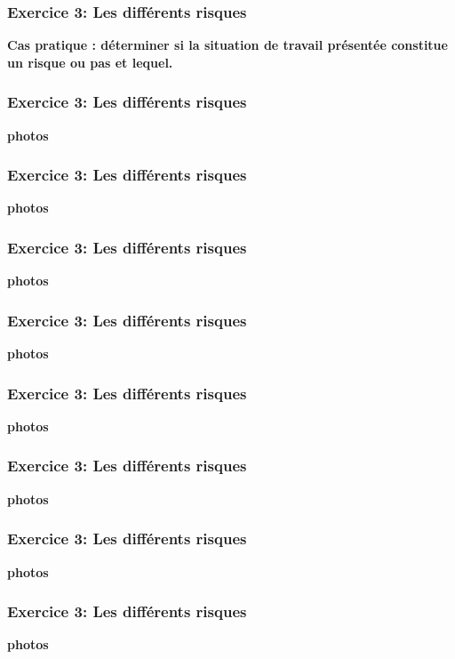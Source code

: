 \documentclass{beamer}
\begin{document}
\begin{frame}
\frametitle{Exercice 3: Les différents risques}

\textbf{Cas pratique : déterminer si la situation de travail présentée constitue un risque ou pas et lequel.} 
\end{frame}

\begin{frame}
\frametitle{Exercice 3: Les différents risques}

\textbf{photos}
\end{frame}

\begin{frame}
\frametitle{Exercice 3: Les différents risques}

\textbf{photos}
\end{frame}

\begin{frame}
\frametitle{Exercice 3: Les différents risques}

\textbf{photos}
\end{frame}

\begin{frame}
\frametitle{Exercice 3: Les différents risques}

\textbf{photos}
\end{frame}

\begin{frame}
\frametitle{Exercice 3: Les différents risques}

\textbf{photos}
\end{frame}

\begin{frame}
\frametitle{Exercice 3: Les différents risques}

\textbf{photos}
\end{frame}

\begin{frame}
\frametitle{Exercice 3: Les différents risques}

\textbf{photos}
\end{frame}

\begin{frame}
\frametitle{Exercice 3: Les différents risques}

\textbf{photos}
\end{frame}
\end{document}
